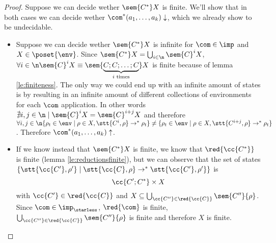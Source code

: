 \begin{proof}
  Suppose we can decide wether \(\sem{C^*}X\) is finite. We'll show
  that in both cases we can decide wether \(\com^*(a_1, \dots,
  a_k)\downarrow\), which we already show to be undecidable.
  \begin{itemize}
  \item Suppose we can decide wether \(\sem{C^*}X\) is infinite for
    \(\com\in\imp\) and \(X\in\poset{\env}\). Since \(\sem{C^*}X =
    \bigcup_{i\in\n}\sem{C}^i X\), \(\forall i \in \n \sem{C}^i X
    \equiv \sem{\underbrace{C;C;\dots;C}_{i\text{ times}}}X\) is
    finite because of lemma \ref{le:finiteness}. The only way we could
    end up with an infinite amount of states is by resulting in an
    infinite amount of different collections of environments for each
    \(\com\) application. In other words \(\nexists i,j \in \n \mid
    \sem{C}^i X = \sem{C}^{i+j}X\) and therefore \(\forall i,j\in\n
    \{\rho_t \in \env \mid \rho \in X , \stt{C^i, \rho} \to^* \rho_t\}
    \neq \{\rho_t \in \env \mid \rho \in X , \stt{C^{i+j}, \rho} \to^*
    \rho_t\}\). Therefore \(\com^*(a_1, \dots, a_k)\uparrow\).
  \item If we know instead that \(\sem{C^*}X\) is finite, we know that
    \(\red{\cc{C^*}}\) is finite (lemma \ref{le:reductionsfinite}),
    but we can observe that the set of states \(\{\stt{\cc{C'}, \rho'}
    \mid \stt{\cc{C}, \rho} \to^* \stt{\cc{C'}, \rho'}\}\)
    is \[\cc{C';C^*} \times X\] with \(\cc{C'}\in\red{\cc{C}}\) and
    \(X \subseteq \bigcup_{\cc{C''}\in\red{\cc{C}}} \sem{C''} \{\rho\}
    \). Since \(\com \in \imp_\starless\), \(\red{\com}\) is finite,
    \(\bigcup_{\cc{C''}\in\red{\cc{C}}} \sem{C''} \{\rho\}\) is finite
    and therefore \(X\) is finite.
  \end{itemize}
\end{proof}
